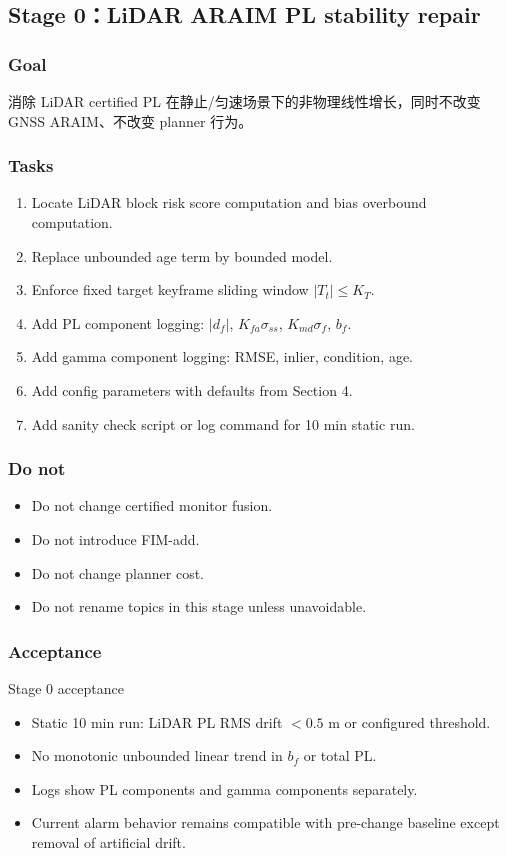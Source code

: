\documentclass[11pt,a4paper]{article}
\begin{document}
\subsection{Stage 0：LiDAR ARAIM PL stability repair}

\subsubsection{Goal}
消除 LiDAR certified PL 在静止/匀速场景下的非物理线性增长，同时不改变 GNSS ARAIM、不改变 planner 行为。

\subsubsection{Tasks}
\begin{enumerate}
\item Locate LiDAR block risk score computation and bias overbound computation.
\item Replace unbounded age term by bounded model.
\item Enforce fixed target keyframe sliding window $|T_t|\le K_T$.
\item Add PL component logging: $|d_f|$, $K_{fa}\sigma_{ss}$, $K_{md}\sigma_f$, $b_f$.
\item Add gamma component logging: RMSE, inlier, condition, age.
\item Add config parameters with defaults from Section 4.
\item Add sanity check script or log command for 10 min static run.
\end{enumerate}

\subsubsection{Do not}
\begin{itemize}
\item Do not change certified monitor fusion.
\item Do not introduce FIM-add.
\item Do not change planner cost.
\item Do not rename topics in this stage unless unavoidable.
\end{itemize}

\subsubsection{Acceptance}
\begin{acceptbox}{Stage 0 acceptance}
\begin{itemize}
  \item Static 10 min run: LiDAR PL RMS drift $<0.5$ m or configured threshold.
  \item No monotonic unbounded linear trend in $b_f$ or total PL.
  \item Logs show PL components and gamma components separately.
  \item Current alarm behavior remains compatible with pre-change baseline except removal of artificial drift.
\end{itemize}
\end{acceptbox}
\end{document}
